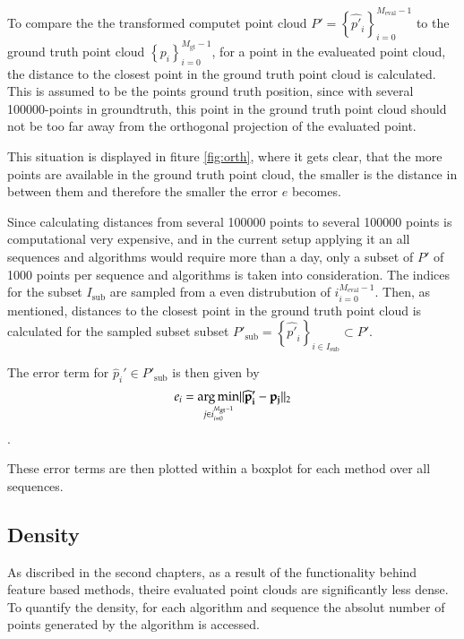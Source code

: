 	To compare the the transformed computet point cloud $P' = \left\{{\widehat{p'}_i}\right\}_{i=0}^{M_{\text{eval}}-1}$ to the ground truth point cloud
	$\left\{p_i\right\}_{i=0}^{M_{\text{gt}}-1}$, for a point in the evalueated point cloud, the distance to the closest point in the ground truth
	point cloud is calculated. This is assumed to be the points ground truth position, since with several 100000-points in groundtruth, this point in 
	the ground truth point cloud should not be too far away from the orthogonal projection of the evaluated point. 
	
	
	This situation is displayed in fiture \ref{fig:orth}, where it gets clear, that the more points are available in the ground truth point cloud, 
	the smaller is the distance in between them and therefore the smaller the error $e$ becomes.

	Since calculating distances from several 100000 points to several 100000 points is computational very expensive, and in the current setup applying 
	it an all sequences and algorithms would require more than a day, only a subset of $P'$ of 1000 points per sequence and algorithms
	is taken into consideration. The indices for the subset $I_{\text{sub}}$ are sampled from a even distrubution of ${i}_{i = 0}^{M_{\text{eval}}-1}$. 
	Then, as mentioned, distances to the closest point in the ground truth point cloud is calculated for the sampled subset subset 
	$P'_{\text{sub}} = \left\{{\widehat{p'}_i}\right\}_{i \in I_{\text{sub}}} \subset P'$. 
	
	The error term for $\widehat{p}_i' \in P'_{\text{sub}}$ is then given by
	$$ e_i = \mathop{\mathrm{arg\,min}}_{j \in {i}_{i=0}^{M_{\text{gt}}-1}} \lVert \mathbf{\widehat{p}_i' - p_j} \rVert_2 $$.
	
	These error terms are then plotted within a boxplot for each method over all sequences. 
	
	\subsection{Density}
	
	As discribed in the second chapters, as a result of the functionality behind feature based methods, theire evaluated point clouds are 
	significantly less dense. To quantify the density, for each algorithm and sequence the absolut number of points generated by the 
	algorithm is accessed. 
	
